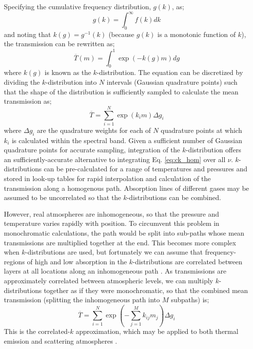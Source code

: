 \documentclass[final,5p,times,twocolumn,authoryear]{elsarticle}
\begin{document}
Specifying the cumulative frequency distribution, $g(k)$, as;
\begin{equation}
g(k)=\int^{\infty}_{0} f(k)dk
\end{equation}
and noting that $k(g)=g^{-1}(k)$ (because $g(k)$ is a monotonic function of $k$), the transmission can be rewritten as;
\begin{equation}
\overline{T}(m)=\int^{1}_{0} \exp(-k(g)m) dg
\end{equation}
where $k(g)$ is known as the $k$-distribution.  The equation can be discretized by dividing the $k$-distribution into $N$ intervals (Gaussian quadrature points) such that the shape of the distribution is sufficiently sampled to calculate the mean transmission as;
\begin{equation}
\overline{T}=\displaystyle\sum^{N}_{i=1}\exp\left(k_{i}m\right)\Delta g_i
\label{eq:ck_transmission}
\end{equation}
where $\Delta g_i$ are the quadrature weights for each of $N$ quadrature points at which $k_{i}$ is calculated within the spectral band.  Given a sufficient number of Gaussian quadrature points for accurate sampling, integration of the $k$-distribution offers an sufficiently-accurate alternative to integrating Eq. \ref{eq:ck_hom} over all $\nu$.  $k$-distributions can be pre-calculated for a range of temperatures and pressures and stored in look-up tables for rapid interpolation and calculation of the transmission along a homogenous path.  Absorption lines of different gases may be assumed to be uncorrelated \citep{03irwbook} so that the $k$-distributions can be combined.

However, real atmospheres are inhomogeneous, so that the pressure and temperature varies rapidly with position.  To circumvent this problem in monochromatic calculations, the path would be split into sub-paths whose mean transmissions are multiplied together at the end.  This becomes more complex when $k$-distributions are used, but fortunately we can assume that frequency-regions of high and low absorption in the $k$-distributions are correlated between layers at all locations along an inhomogeneous path \citep{91lacis}.  As transmissions are approximately correlated between atmospheric levels, we can multiply $k$-distributions together as if they were monochromatic, so that the combined mean transmission (splitting the inhomogeneous path into $M$ subpaths) is;
\begin{equation}
\overline{T}=\displaystyle\sum^{N}_{i=1}\exp\left( -\displaystyle\sum^{M}_{j=1}k_{ij}m_{j}\right)\Delta g_i
\end{equation}
This is the correlated-$k$ approximation, which may be applied to both thermal emission and scattering atmospheres \citep{03irwbook}.  
\end{document}
